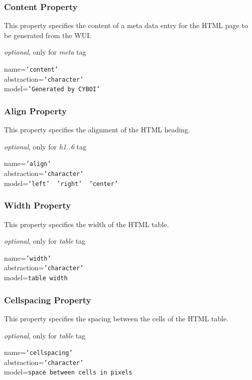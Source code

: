 \subsubsection{Content Property}

This property specifies the content of a meta data entry for the HTML page to
be generated from the WUI.

\emph{optional}, only for \emph{meta} tag

name=\texttt{'content'}\\
abstraction=\texttt{'character'}\\
model=\texttt{'Generated by CYBOI'}

\subsubsection{Align Property}

This property specifies the alignment of the HTML heading.

\emph{optional}, only for \emph{h1..6} tag

name=\texttt{'align'}\\
abstraction=\texttt{'character'}\\
model=\texttt{'left' \vline\ 'right' \vline\ 'center'}

\subsubsection{Width Property}

This property specifies the width of the HTML table.

\emph{optional}, only for \emph{table} tag

name=\texttt{'width'}\\
abstraction=\texttt{'character'}\\
model=\texttt{table width}

\subsubsection{Cellspacing Property}

This property specifies the spacing between the cells of the HTML table.

\emph{optional}, only for \emph{table} tag

name=\texttt{'cellspacing'}\\
abstraction=\texttt{'character'}\\
model=\texttt{space between cells in pixels}

